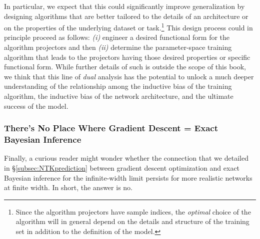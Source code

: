 In particular, we expect that this could significantly improve generalization by designing algorithms that are better tailored to the details of an architecture or on the properties of the underlying dataset or task.\footnote{
Since the algorithm projectors have sample indices, the \emph{optimal} choice of the algorithm will in general depend on the details and structure of the training set in addition to the definition of the model.
}
 This design process could in principle proceed as follows: %
\emph{(i)} engineer a desired functional form for the algorithm projectors and then \emph{(ii)} determine the parameter-space training algorithm that leads to the projectors having those desired properties or specific functional form. 
While further details of such  is outside the scope of this book, we think that this line of \emph{dual} analysis has the potential to unlock a much deeper understanding of the relationship among the inductive bias of the training algorithm, the inductive bias of the network architecture, and the ultimate success of the model.

















\subsubsection{There's No Place Where Gradient Descent = Exact Bayesian Inference}
Finally, a curious reader might wonder whether the connection that we detailed in \S\ref{subsec:NTKprediction}  between gradient descent optimization and exact Bayesian inference for the infinite-width limit  persists for more realistic networks at finite width. In short, the answer is no.

